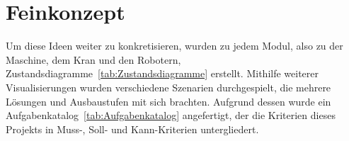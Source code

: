 \section{Feinkonzept}
Um diese Ideen weiter zu konkretisieren, wurden zu jedem Modul, also zu der Maschine, dem
Kran und den Robotern, Zustandsdiagramme~\ref{tab:Zustandsdiagramme} erstellt. Mithilfe weiterer Visualisierungen wurden verschiedene Szenarien durchgespielt, die mehrere Lösungen und Ausbaustufen mit sich
brachten. Aufgrund dessen wurde ein Aufgabenkatalog~\ref{tab:Aufgabenkatalog} angefertigt, der die Kriterien dieses
Projekts in Muss-, Soll- und Kann-Kriterien untergliedert.